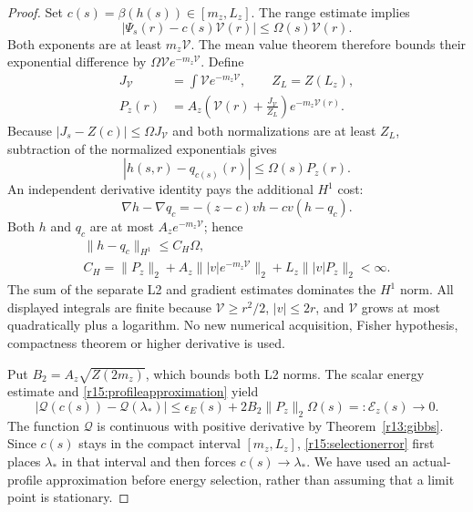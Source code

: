 \documentclass[11pt]{article}
\numberwithin{equation}{section}
\begin{document}
\begin{proof}
Set $c(s)=\beta(h(s))\in[m_z,L_z]$. The range estimate implies
\[
 |\Psi_s(r)-c(s)\mathcal V(r)|\le\Omega(s)\mathcal V(r).
\]
Both exponents are at least $m_z\mathcal V$. The mean value theorem
therefore bounds their exponential difference by
$\Omega\mathcal V e^{-m_z\mathcal V}$. Define
\begin{align*}
 J_{\mathcal V}&=\int\mathcal V e^{-m_z\mathcal V},\qquad Z_L=Z(L_z),\\
 P_z(r)&=A_z\left(\mathcal V(r)+\frac{J_{\mathcal V}}{Z_L}\right)
                        e^{-m_z\mathcal V(r)}.
\end{align*}
Because $|J_s-Z(c)|\le\Omega J_{\mathcal V}$ and both normalizations
are at least $Z_L$, subtraction of the normalized exponentials gives
\begin{equation}\label{r15:profileapproximation}
 |h(s,r)-q_{c(s)}(r)|\le\Omega(s)P_z(r).
\end{equation}
An independent derivative identity pays the additional $H^1$ cost:
\begin{equation}\label{r15:gradientapproximation}
 \nabla h-\nabla q_c=-(z-c)vh-cv(h-q_c).
\end{equation}
Both $h$ and $q_c$ are at most $A_ze^{-m_z\mathcal V}$; hence
\begin{equation}\label{r15:H1approximation}
 \begin{gathered}
 \|h-q_c\|_{H^1}\le C_H\Omega,\\
 C_H=\|P_z\|_2+A_z\||v|e^{-m_z\mathcal V}\|_2
                         +L_z\||v|P_z\|_2<\infty.
 \end{gathered}
\end{equation}
The sum of the separate L2 and gradient estimates dominates the $H^1$
norm. All displayed integrals are finite because
$\mathcal V\ge r^2/2$, $|v|\le2r$, and $\mathcal V$ grows at most
quadratically plus a logarithm. No new numerical acquisition, Fisher
hypothesis, compactness theorem or higher derivative is used.

Put $B_2=A_z\sqrt{Z(2m_z)}$, which bounds both L2 norms.
The scalar energy estimate and \eqref{r15:profileapproximation} yield
\begin{equation}\label{r15:selectionerror}
 |\mathcal Q(c(s))-\mathcal Q(\lambda_*)|
 \le\epsilon_E(s)+2B_2\|P_z\|_2\Omega(s)
 =:\mathcal E_z(s)\longrightarrow0.
\end{equation}
The function $\mathcal Q$ is continuous with positive derivative by
Theorem~\ref{r13:gibbs}. Since $c(s)$ stays in the compact interval
$[m_z,L_z]$, \eqref{r15:selectionerror} first places $\lambda_*$ in
that interval and then forces $c(s)\to\lambda_*$. We have used an
actual-profile approximation before energy selection, rather than
assuming that a limit point is stationary.


\end{proof}
\end{document}
